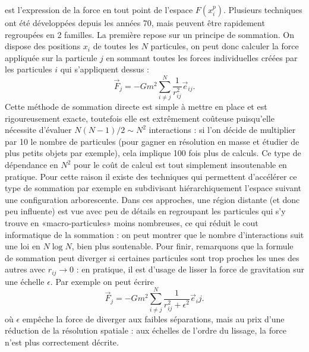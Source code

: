  est l'expression de la force en tout point de l'espace ${F}(x_i^p)$. Plusieurs techniques ont été développées depuis les années 70, mais peuvent être rapidement regroupées en 2 familles. La première repose sur un principe de sommation. On dispose des positions $x_i$ de toutes les $N$ particules, on peut donc calculer la force appliquée sur la particule $j$ en sommant toutes les forces individuelles créées par les particules $i$ qui s'appliquent dessus  :
\begin{equation}
\vec F_j=-Gm^2\sum_{i\neq j} ^N\frac{1}{r_{ij}^2}\vec e_{ij}. 
\end{equation}
Cette méthode de sommation directe est simple à mettre en place et est rigoureusement exacte, toutefois elle est extrêmement coûteuse puisqu'elle nécessite d'évaluer $N(N-1)/2 \sim N^2$ interactions : si l'on décide de multiplier par 10 le nombre de particules (pour gagner en résolution en masse et étudier de plus petits objets par exemple), cela implique 100 fois plus de calculs. Ce type de dépendance en $N^2$ pour le coût de calcul est tout simplement insoutenable en pratique. Pour cette raison il existe des techniques qui permettent d'accélérer ce type de sommation par exemple en subdivisant hiérarchiquement l'espace suivant une configuration arborescente. Dans ces approches, une région distante (et donc peu influente) est vue avec peu de détails en regroupant les particules qui s'y trouve en «macro-particules» moins nombreuses, ce qui réduit le cout informatique de la sommation : on peut montrer que le nombre d'interactions suit une loi en $N\log N$, bien plus soutenable. Pour finir, remarquons que la formule de sommation peut diverger si certaines particules sont trop proches les unes des autres avec $r_{ij}\rightarrow 0$ : en pratique, il est d'usage de lisser la force de gravitation sur une échelle $\epsilon$. Par exemple on peut écrire
\begin{equation}
\vec F_j=-Gm^2\sum_{i\neq j} ^N\frac{1}{r_{ij}^2+\epsilon^2}\vec e_ij. 
\end{equation}
où $\epsilon$ empêche la force de diverger aux faibles séparations, mais au prix d'une réduction de la résolution spatiale : aux échelles de l'ordre du lissage, la force n'est plus correctement décrite.

